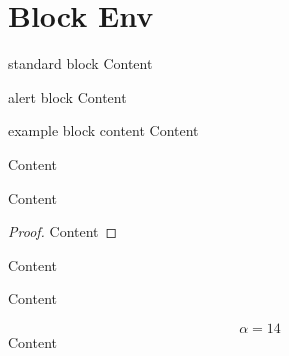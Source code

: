 
\section{Block Env}

\begin{frame}
  \begin{block}{standard block}
    Content
  \end{block}
  \begin{alertblock}{alert block}
    Content
  \end{alertblock}
  \begin{exampleblock}{example block}
    content
    Content \cite{scharnowskifuzzware}
  \end{exampleblock}
\end{frame}

\begin{frame}
  \begin{theorem}
    Content
  \end{theorem}
  \begin{definition}
    Content
  \end{definition}
  \begin{proof}
    Content
  \end{proof}
  \begin{lemma}
    Content
  \end{lemma}
\end{frame}
\begin{frame}
  \begin{corollary}
    Content
  \end{corollary}
  \begin{example}
    \begin{equation}
      \alpha = 14
    \end{equation}
    Content
  \end{example}
\end{frame}